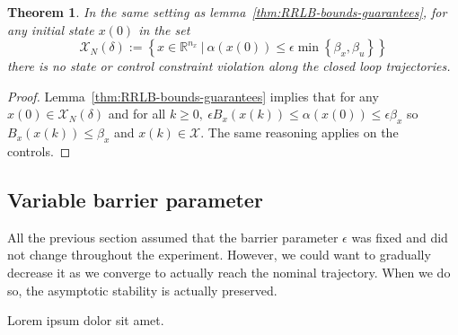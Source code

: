 \documentclass[conference]{IEEEtran}
\newtheorem{theorem}{Theorem}[section]
\theoremstyle{definition}
\theoremstyle{remark}
\def\cal#1{\mathcal{#1}}
\newcommand{\R}{\mathbb{R}}
\begin{document}
\begin{theorem}
	In the same setting as lemma~\ref{thm:RRLB-bounds-guarantees}, for any initial state $x(0)$ in the set
	$$\cal{X}_N(\delta):=\left\{x\in\R^{n_x}~|~\alpha(x(0))\leq\epsilon\min\left\{\beta_x,\beta_u\right\}\right\}$$
	there is no state or control constraint violation along the closed loop trajectories.
\end{theorem}

\begin{proof}
	Lemma~\ref{thm:RRLB-bounds-guarantees} implies that for any $x(0)\in\cal{X}_N(\delta)$ and for all $k\geq 0,~\epsilon B_x(x(k))\leq\alpha(x(0))\leq\epsilon\beta_x$ so $B_x(x(k))\leq \beta_x$ and $x(k)\in\cal{X}$.
	The same reasoning applies on the controls.
\end{proof}

\subsection{Variable barrier parameter}
All the previous section assumed that the barrier parameter $\epsilon$ was fixed and did not change throughout the experiment.
However, we could want to gradually decrease it as we converge to actually reach the nominal trajectory.
When we do so, the asymptotic stability is actually preserved.



\appendix
Lorem ipsum dolor sit amet.

\printbibliography

\end{document}

